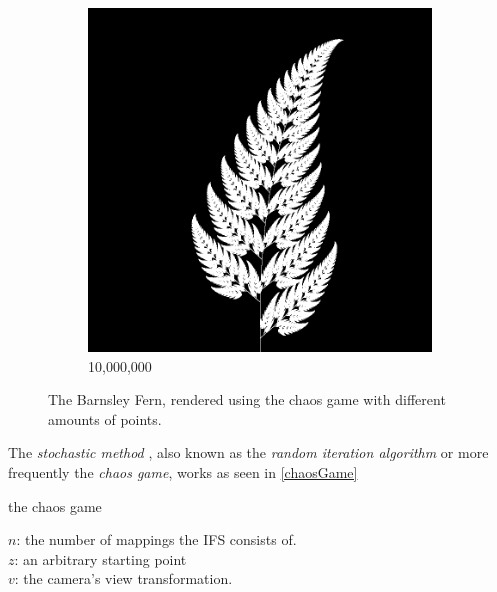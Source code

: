 \documentclass[11pt]{article}
\begin{document}
\begin{figure}
\begin{subfigure}[b]{0.4\textwidth}
         \includegraphics[width=\textwidth]{figures/barnsley_100000000}
         \caption{10,000,000}
         \label{figure:barnsley_ten_mil}
     \end{subfigure}
        \caption{The Barnsley Fern, rendered using the chaos game with different amounts of points.}
        \label{figure:barnsley_chaos_game_points}
\end{figure}


The \emph{stochastic method} \cite{hepting1991rendering}, also known as the \emph{random iteration algorithm} \cite{barnsley1988fractals} or more frequently the \emph{chaos game}, works as seen in \autoref{chaosGame}

\begin{algorithm}
\caption{the chaos game}
\label{chaosGame}
  $n$: the number of mappings the IFS consists of. \\
  $z$: an arbitrary starting point \\
  $v$: the camera's view transformation. \\

\end{algorithm}
\end{document}

